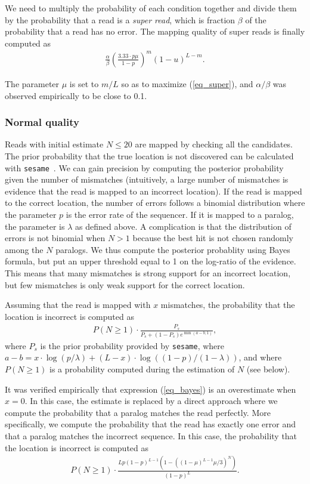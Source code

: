 \documentclass[a4,center,fleqn]{NAR}
\begin{document}
We need to multiply the probability of each condition together and divide
them by the probability that a read is a \emph{super read}, which is fraction
$\beta$ of the probability that a read has no error. The mapping quality of
super reads is finally computed as
\begin{align}
\label{eq_super}
\frac{\alpha}{\beta} \left( \frac{3.33 \cdot p\mu}{1-p}
\right)^m (1-u)^{L-m}.
\end{align}

The parameter $\mu$ is set to $m/L$ so as to maximize (\ref{eq_super}),
and $\alpha/\beta$ was observed empirically to be close to 0.1.


\subsubsection{Normal quality} Reads with initial estimate $N \leq 20$ are
mapped by checking all the candidates. The prior probability that the true
location is not discovered can be calculated with
\texttt{sesame}~\cite{Filion619155}. We can gain precision by computing the
posterior probability given the number of mismatches (intuitively, a large
number of mismatches is evidence that the read is mapped to an incorrect
location). If the read is mapped to the correct location, the number of
errors follows a binomial distribution where the parameter $p$ is the
error rate of the sequencer. If it is mapped to a paralog, the parameter
is $\lambda$ as defined above. A complication is that the distribution of
errors is not binomial when $N > 1$ because the best hit is not chosen
randomly among the $N$ paralogs. We thus compute the posterior probablity
using Bayes formula, but put an upper threshold equal to 1 on the
log-ratio of the evidence. This means that many mismatches is strong
support for an incorrect location, but few mismatches is only weak support
for the correct location.

Assuming that the read is mapped with $x$ mismatches, the probability that
the location is incorrect is computed as
\begin{align}
\label{eq_bayes}
P(N \geq 1) \cdot \frac{P_s}{P_s + (1-P_s)e^{\min(a-b,1)}},
\end{align}
where $P_s$ is the prior probability provided by \texttt{sesame}, where
$a-b=x \cdot \log(p/\lambda)+(L-x) \cdot \log((1-p)/(1-\lambda))$, and
where $P(N \geq 1)$ is a probability computed during the estimation of $N$
(see below).

It was verified empirically that expression (\ref{eq_bayes}) is an
overestimate when $x = 0$. In this case, the estimate is replaced by a
direct approach where we compute the probability that a paralog matches
the read perfectly. More specifically, we compute the probability that the
read has exactly one error and that a paralog matches the incorrect
sequence. In this case, the probability that the location is incorrect is
computed as
\begin{align}
\label{eq_x0}
P(N \geq 1) \cdot \frac{Lp(1-p)^{L-1}
\left(1-\left((1-\mu)^{L-1}\mu/3\right)^N\right)}{(1-p)^L}.
\end{align}
\end{document}
